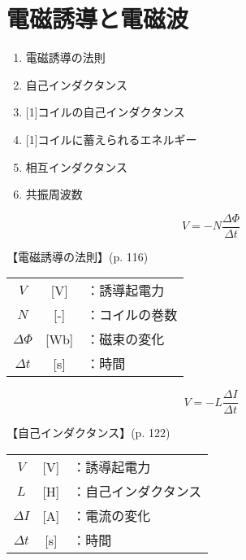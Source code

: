 \documentclass[10pt]{jarticle}
\begin{document}
\newpage
\addtocounter{page}{-1}
\thispagestyle{empty}
\section{電磁誘導と電磁波}

\begin{enumerate}
\setcounter{enumi}{\thepage}
\small
\itemsep-4mm
\item 電磁誘導の法則 \\
\item 自己インダクタンス \\
\item \scalebox{0.9}[1]{コイルの自己インダクタンス} \\
\item \scalebox{0.85}[1]{コイルに蓄えられるエネルギー}\\
\item 相互インダクタンス \\
\item 共振周波数 \\
\end{enumerate}


\newpage
\[
  V = - N \frac{\mathit{\Delta} \Phi}{\mathit{\Delta} t}
\]


\vskip3mm
\noindent
【電磁誘導の法則】{\footnotesize (p. 116)}

\begin{tabular}{ccl}
$V$	&[V]	&：誘導起電力\\
$N$	&[-]	&：コイルの巻数\\
$\mathit{\Delta} \Phi$	&[Wb]	&：磁束の変化 \\
  $\mathit{\Delta} t$	&[s]	&：時間\\
\end{tabular}



\newpage
\[
  V = - L \frac{\mathit{\Delta} I}{\mathit{\Delta} t}
\]


\vskip3mm
\noindent
【自己インダクタンス】{\footnotesize (p. 122)}

\begin{tabular}{ccl}
$V$	&[V]	&：誘導起電力\\
$L$	&[H]	&：自己インダクタンス\\
  $\mathit{\Delta}I$	&[A]	&：電流の変化 \\
$\mathit{\Delta}t$	&[s]	&：時間\\
\end{tabular}
\end{document}

